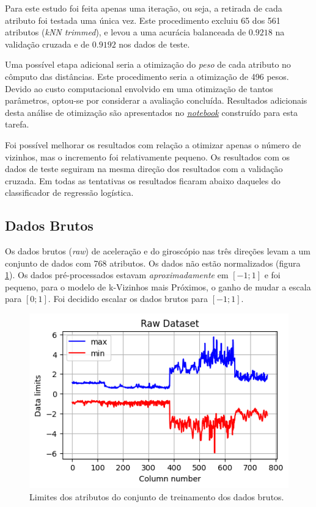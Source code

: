 \documentclass[final,5p]{elsarticle}
\numberwithin{equation}{section}
\begin{document}
        Para este estudo foi feita apenas uma iteração, ou seja, a retirada de cada atributo foi testada uma única vez. Este procedimento excluiu 65 dos 561 atributos (\emph{kNN trimmed}), e levou a uma acurácia balanceada de $0.9218$ na validação cruzada e de $0.9192$ nos dados de teste.

        Uma possível etapa adicional seria a otimização do \emph{peso} de cada atributo no cômputo das distâncias. Este procedimento seria a otimização de 496 pesos. Devido ao custo computacional envolvido em uma otimização de tantos parâmetros, optou-se por considerar a avaliação concluída. Resultados adicionais desta análise de otimização são apresentados no \href{https://github.com/TiagoCAAmorim/machine_learning/blob/main/Lista02/Lista02.ipynb}{\emph{notebook}} construído para esta tarefa.

        Foi possível melhorar os resultados com relação a otimizar apenas o número de vizinhos, mas o incremento foi relativamente pequeno. Os resultados com os dados de teste seguiram na mesma direção dos resultados com a validação cruzada. Em todas as tentativas os resultados ficaram abaixo daqueles do classificador de regressão logística.

    \subsection{Dados Brutos}

        Os dados brutos (\emph{raw}) de aceleração e do giroscópio nas três direções levam a um conjunto de dados com 768 atributos. Os dados não estão normalizados (figura \ref{fig:dados_brutos}). Os dados pré-processados estavam \emph{aproximadamente} em $[-1;1]$ e foi pequeno, para o modelo de k-Vizinhos mais Próximos, o ganho de mudar a escala para $[0;1]$. Foi decidido escalar os dados brutos para $[-1;1]$.

        \begin{figure}[hbt!]
            \includegraphics[width=0.95\columnwidth]{B_Dataset_Scale.png}
            \caption{Limites dos atributos do conjunto de treinamento dos dados brutos.}
            \label{fig:dados_brutos}
        \end{figure}
\end{document}

